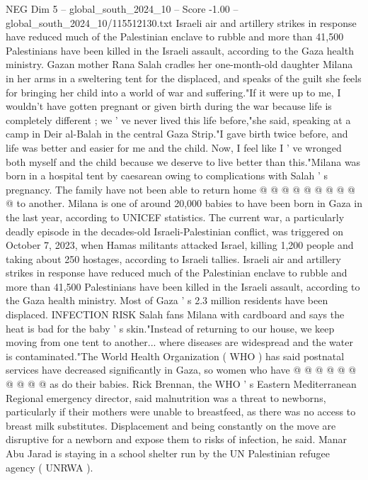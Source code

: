 \begin{textsample}{NEG Dim 5 – global\_south\_2024\_10 – Score -1.00 – global\_south\_2024\_10/115512130.txt}  \label{ex:f5_neg_134}
Israeli air and artillery strikes in response have reduced much of the Palestinian enclave to rubble and more than 41,500 Palestinians have been killed in the Israeli assault, according to the Gaza health ministry.
Gazan mother Rana Salah cradles her one-month-old daughter Milana in her arms in a sweltering tent for the displaced, and speaks of the guilt she feels for bringing her child into a world of war and suffering."If it were up to me, I wouldn't have gotten pregnant or given birth during the war because life is completely different ; we ' ve never lived this life before,"she said, speaking at a camp in Deir al-Balah in the central Gaza Strip."I gave birth twice before, and life was better and easier for me and the child.
Now, I feel like I ' ve wronged both myself and the child because we deserve to live better than this."Milana was born in a hospital tent by caesarean owing to complications with Salah ' s pregnancy.
The family have not been able to return home @ @ @ @ @ @ @ @ @ @ to another.
Milana is one of around 20,000 babies to have been born in Gaza in the last year, according to UNICEF statistics.
The current war, a particularly deadly episode in the decades-old Israeli-Palestinian conflict, was triggered on October 7, 2023, when Hamas militants attacked Israel, killing 1,200 people and taking about 250 hostages, according to Israeli tallies.
Israeli air and artillery strikes in response have reduced much of the Palestinian enclave to rubble and more than 41,500 Palestinians have been killed in the Israeli assault, according to the Gaza health ministry.
Most of Gaza ' s 2.3 million residents have been displaced.
INFECTION RISK Salah fans Milana with cardboard and says the heat is bad for the baby ' s skin."Instead of returning to our house, we keep moving from one tent to another... where diseases are widespread and the water is contaminated."The World Health Organization ( WHO ) has said postnatal services have decreased significantly in Gaza, so women who have @ @ @ @ @ @ @ @ @ @ as do their babies.
Rick Brennan, the WHO ' s Eastern Mediterranean Regional emergency director, said malnutrition was a threat to newborns, particularly if their mothers were unable to breastfeed, as there was no access to breast milk substitutes.
Displacement and being constantly on the move are disruptive for a newborn and expose them to risks of infection, he said.
Manar Abu Jarad is staying in a school shelter run by the UN Palestinian refugee agency ( UNRWA ).

\end{textsample}
